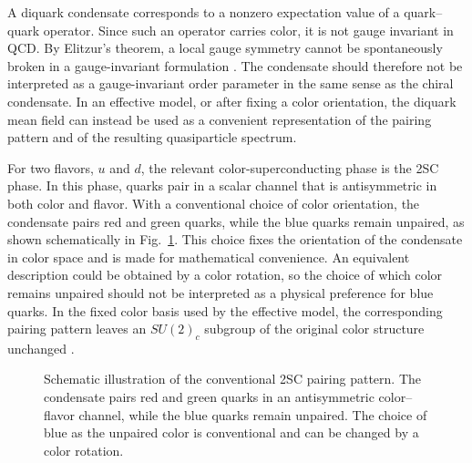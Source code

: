 A diquark condensate corresponds to a nonzero expectation value of a
quark--quark operator. Since such an operator carries color, it is not
gauge invariant in QCD. By Elitzur's theorem, a local gauge symmetry
cannot be spontaneously broken in a gauge-invariant formulation
\cite{Elitzur1975}. The condensate should therefore not be interpreted as
a gauge-invariant order parameter in the same sense as the chiral
condensate. In an effective model, or after fixing a color orientation, the
diquark mean field can instead be used as a convenient representation of
the pairing pattern and of the resulting quasiparticle spectrum.

For two flavors, \(u\) and \(d\), the relevant color-superconducting
phase is the 2SC phase. In this phase, quarks pair in a scalar channel that is
antisymmetric in both color and flavor. With a conventional choice of
color orientation, the condensate pairs red and green quarks, while the
blue quarks remain unpaired, as shown schematically in
Fig.~\ref{fig:2sc_pairing_schematic}. This choice fixes the orientation
of the condensate in color space and is made for mathematical
convenience. An equivalent description could be obtained by a color
rotation, so the choice of which color remains unpaired should not be
interpreted as a physical preference for blue quarks. In the fixed color
basis used by the effective model, the corresponding pairing pattern
leaves an \(SU(2)_c\) subgroup of the original color structure unchanged
\cite{Shovkovy2005,Andersen2024}.

\begin{figure}[htbp]
\centering
{}
\caption{Schematic illustration of the conventional 2SC pairing pattern.
The condensate pairs red and green quarks in an antisymmetric
color--flavor channel, while the blue quarks remain unpaired. The choice
of blue as the unpaired color is conventional and can be changed by a color
rotation.}
\label{fig:2sc_pairing_schematic}
\end{figure}

